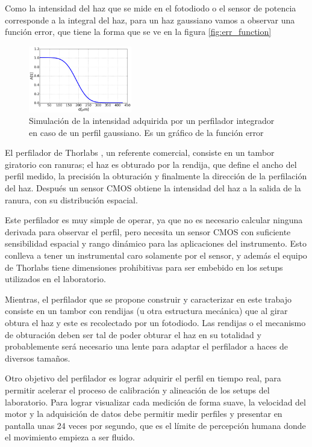 Como la intensidad del haz que se mide en el fotodiodo o el sensor de potencia corresponde a la integral del haz, para un haz gaussiano vamos a observar una función error, que tiene la forma que se ve en la figura \ref{fig:err_function}

\begin{figure}[H]
\centering
\includegraphics[width=0.4\textwidth]{fig/perfilador/err_function}
\caption{Simulación de la intensidad adquirida por un perfilador integrador en caso de un perfil gaussiano. Es un gráfico de la función error}
\label{fig:perfilador/err_function}
\end{figure}

El perfilador de Thorlabs \cite{thorlabs_profiler}, un referente comercial, consiste en un tambor giratorio con ranuras; el haz es obturado por la rendija, que define el ancho del perfil medido, la precisión la obturación y finalmente la dirección de la perfilación del haz. Después un sensor CMOS obtiene la intensidad del haz a la salida de la ranura, con su distribución espacial. 

Este perfilador es muy simple de operar, ya que no es necesario calcular ninguna derivada para observar el perfil, pero necesita un sensor CMOS con suficiente sensibilidad espacial y rango dinámico para las aplicaciones del instrumento. Esto conlleva a tener un instrumental caro solamente por el sensor, y además el equipo de Thorlabs tiene dimensiones prohibitivas para ser embebido en los setups utilizados en el laboratorio.

Mientras, el perfilador que se propone construir y caracterizar en este trabajo consiste en un tambor con rendijas (u otra estructura mecánica) que al girar obtura el haz y este es recolectado por un fotodiodo. Las rendijas o el mecanismo de obturación deben ser tal de poder obturar el haz en su totalidad y probablemente será necesario una lente para adaptar el perfilador a haces de diversos tamaños.

Otro objetivo del perfilador es lograr adquirir el perfil en tiempo real, para permitir acelerar el proceso de calibración y alineación de los setups del laboratorio. Para lograr visualizar cada medición de forma suave, la velocidad del motor y la adquisición de datos debe permitir medir perfiles y presentar en pantalla unas 24 veces por segundo, que es el límite de percepción humana donde el movimiento empieza a ser fluido.

